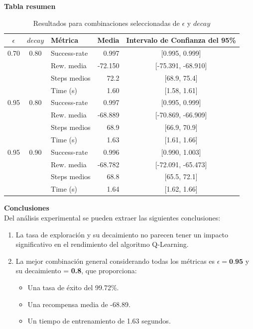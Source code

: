 \newpage
\textbf{Tabla resumen}

\begin{table}[H]
    \centering
    \begin{tabular}{|c|c|l|r|c|}
    \hline
    $\epsilon$ & $decay$ & Métrica        & Media    & Intervalo de Confianza del 95\% \\
    \hline
    0.70 & 0.80 & Success-rate  & 0.997   & [0.995, 0.999] \\
         &      & Rew. media    & -72.150 & [-75.391, -68.910] \\
         &      & Steps medios  & 72.2    & [68.9, 75.4] \\
         &      & Time (s)      & 1.60    & [1.58, 1.61] \\
    \hline
    0.95 & 0.80 & Success-rate  & 0.997   & [0.995, 0.999] \\
         &      & Rew. media    & -68.889 & [-70.869, -66.909] \\
         &      & Steps medios  & 68.9    & [66.9, 70.9] \\
         &      & Time (s)      & 1.63    & [1.61, 1.66] \\
    \hline
    0.95 & 0.90 & Success-rate  & 0.996   & [0.990, 1.003] \\
         &      & Rew. media    & -68.782 & [-72.091, -65.473] \\
         &      & Steps medios  & 68.8    & [65.5, 72.1] \\
         &      & Time (s)      & 1.64    & [1.62, 1.66] \\
    \hline
    \end{tabular}
    \caption{Resultados para combinaciones seleccionadas de $\epsilon$ y $decay$}
    \label{tab:resultados_seleccionados}
\end{table}
    
    

\textbf{Conclusiones}
\\

Del análisis experimental se pueden extraer las siguientes conclusiones:

\begin{enumerate}
    \item La tasa de exploración y su decaimiento no parecen tener un impacto significativo en el rendimiento del algoritmo Q-Learning.
    \item La mejor combinación general considerando todas los métricas es $\epsilon = \textbf{0.95}$ y su decaimiento = \textbf{0.8}, que proporciona:
    \begin{itemize}
        \item Una tasa de éxito del 99.72\%.
        \item Una recompensa media de -68.89.
        \item Un tiempo de entrenamiento de 1.63 segundos.
    \end{itemize}
\end{enumerate}

